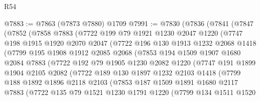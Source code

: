 \begin{lexlean}{R54}
\begin{coremodule}
@7883 := @7863 (@7873 @7880) @1709
@7991 := @7830
    (@7836
      (@7841
        (@7847
          (@7852
            (@7858
              @7883
              (@7722
                @199
                @79
                @1921
                @1230
                @2047
                @1220
                (@7747
                  @198
                  @1915
                  @1920
                  @2070
                  @2047
                  (@7722
                    @196
                    @130
                    @1913
                    @1232
                    @2068
                    @1418
                    (@7799
                      @195
                      @1908
                      @1912
                      @2085
                      @2068
                      (@7853
                        @194
                        @1509
                        @1907
                        @1680
                        @2084
                        @7883
                        (@7722
                          @192
                          @79
                          @1905
                          @1230
                          @2082
                          @1220
                          (@7747
                            @191
                            @1899
                            @1904
                            @2105
                            @2082
                            (@7722
                              @189
                              @130
                              @1897
                              @1232
                              @2103
                              @1418
                              (@7799
                                @188
                                @1892
                                @1896
                                @2118
                                @2103
                                (@7853
                                  @187
                                  @1509
                                  @1891
                                  @1680
                                  @2117
                                  @7883
                                  (@7722
                                    @135
                                    @79
                                    @1521
                                    @1230
                                    @1791
                                    @1220
                                    (@7799
                                      @134
                                      @1511
                                      @1520

\end{coremodule}
\end{lexlean}
